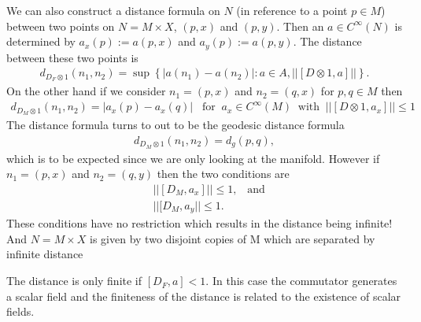 We can also construct a distance formula on $N$ (in reference to a point $p
\in M$) between two points on $N=M\times X$, $(p, x)$ and $(p,y)$. Then an $a
\in C^\infty(N)$ is determined by $a_x(p):=a(p, x)$ and $a_y(p):=a(p, y)$.
The distance between these two points is
\begin{align}
    d_{D_F\otimes 1}(n_1, n_2) =  \sup \left\{ |a(n_1) - a(n_2)|: a\in
    A, ||[D\otimes 1, a]||\right\}.
\end{align}
On the other hand if we consider $n_1 = (p,x)$ and $n_2 = (q, x)$
for $p,q \in M$ then
\begin{align}
    d_{D_M \otimes 1} (n_1, n_2) = |a_x(p) - a_x(q)| \;\;\;\text{for}\;\;
    a_x\in
    C^\infty(M) \;\; \text{with} \;\; ||[D\otimes 1, a_x]|| \leq 1
\end{align}
The distance formula turns to out to be the geodesic distance formula
\begin{align}
    d_{D_M\otimes1}(n_1, n_2) = d_g(p, q),
\end{align}
which is to be expected since we are only looking at the manifold.
However if $n_1 = (p, x)$ and $n_2 = (q, y)$ then the two conditions are
\begin{align}
    &||[D_M, a_x]|| \leq 1, \;\;\; \text{and}\\
    &||[D_M, a_y|| \leq 1.
\end{align}
These conditions have no restriction which results in the distance being
infinite! And $N = M\times X$ is given by two disjoint copies of M  which are
separated by infinite distance

The distance is only finite if $[D_F, a] < 1$. In this case the commutator
generates a scalar field and the finiteness of the distance is
related to the existence of scalar fields.

